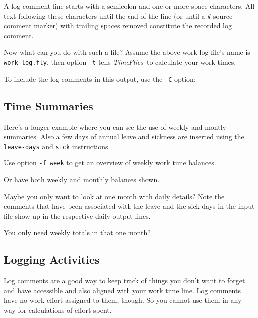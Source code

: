 \documentclass[11pt]{article}
\newcommand{\timeflies}{\emph{TimeFlies}}
\begin{document}


A log comment line starts with a semicolon and one or more space characters. All text following these characters until the end of the line (or until a \verb-#- source comment marker) with trailing spaces removed constitute the recorded log comment.

Now what can you do with such a file? Assume the above work log file's name is \verb:work-log.fly:, then option \verb:-t: tells \timeflies\ to calculate your work times.



To include the log comments in this output, use the \verb=-C= option:



\subsection{Time Summaries}

Here's a longer example where you can see the use of weekly and montly summaries. Also a few days of annual leave and sickness are inserted using the \verb:leave-days: and \verb:sick: instructions.



Use option \verb:-f week: to get an overview of weekly work time balances.



Or have both weekly and monthly balances shown.



Maybe you only want to look at one month with daily details? Note the comments that have been associated with the leave and the sick days in the input file show up in the respective daily output lines.



You only need weekly totals in that one month?



\subsection{Logging Activities}

Log comments are a good way to keep track of things you don't want to forget and have accessible and also aligned with your work time line. Log comments have no work effort assigned to them, though. So you cannot use them in any way for calculations of effort spent.
\end{document}
